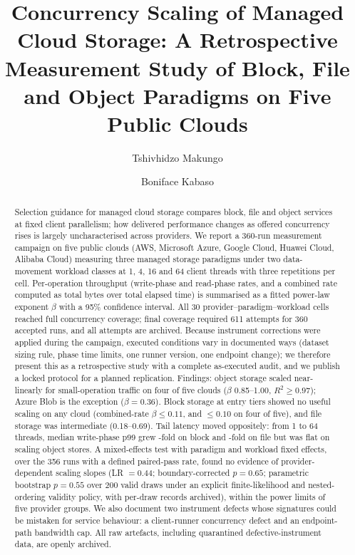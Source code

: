 \documentclass[manuscript,screen,review]{acmart}
\begin{document}



\title{Concurrency Scaling of Managed Cloud Storage: A Retrospective
Measurement Study of Block, File and Object Paradigms on Five Public Clouds}

\author{Tshivhidzo Makungo}
\author{Boniface Kabaso}

\begin{abstract}
Selection guidance for managed cloud storage compares block, file and object
services at fixed client parallelism; how delivered performance changes as
offered concurrency rises is largely uncharacterised across providers. We
report a 360-run measurement campaign on five public clouds (AWS, Microsoft
Azure, Google Cloud, Huawei Cloud, Alibaba Cloud) measuring three managed
storage paradigms under two data-movement workload classes at 1, 4, 16 and 64
client threads with three repetitions per cell. Per-operation throughput
(write-phase and read-phase rates, and a combined rate computed as total bytes
over total elapsed time) is summarised as a fitted power-law exponent $\beta$
with a 95\% confidence interval. All 30 provider--paradigm--workload cells
reached full concurrency coverage; final coverage required 611 attempts for
360 accepted runs, and all attempts are archived. Because instrument
corrections were applied during the campaign, executed conditions vary in
documented ways (dataset sizing rule, phase time limits, one runner version,
one endpoint change); we therefore present this as a retrospective study with
a complete as-executed audit, and we publish a locked protocol for a planned
replication. Findings: object storage scaled near-linearly for small-operation
traffic on four of five clouds ($\beta$ 0.85--1.00, $R^2 \geq 0.97$); Azure
Blob is the exception ($\beta = 0.36$). Block storage at entry tiers showed no
useful scaling on any cloud (combined-rate $\beta \leq 0.11$, and $\leq 0.10$
on four of five), and file storage was intermediate (0.18--0.69). Tail
latency moved oppositely: from 1 to 64 threads, median write-phase p99 grew
\pFoldWriteBlock-fold on block and \pFoldWriteFile-fold on file but was flat on scaling object stores. A
mixed-effects test with paradigm and workload fixed effects, over the 356
runs with a defined paired-pass rate, found no evidence of
provider-dependent scaling slopes (LR $= 0.44$; boundary-corrected
$p = 0.65$; parametric bootstrap $p = 0.55$ over 200 valid draws under an
explicit finite-likelihood and nested-ordering validity policy, with
per-draw records archived), within the power limits of five provider
groups. We also document two instrument defects
whose signatures could be mistaken for service behaviour: a client-runner
concurrency defect and an endpoint-path bandwidth cap. All raw artefacts,
including quarantined defective-instrument data, are openly archived.
\end{abstract}
\end{document}
